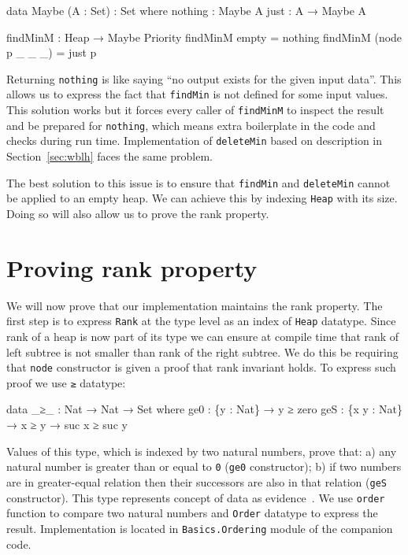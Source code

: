 \begin{code}
data Maybe (A : Set) : Set where
  nothing : Maybe A
  just    : A → Maybe A

findMinM : Heap → Maybe Priority
findMinM empty          = nothing
findMinM (node p _ _ _) = just p
\end{code}

\noindent
Returning \texttt{nothing} is like saying ``no output exists for the given input data''. This allows us to express the fact that \texttt{findMin} is not defined for some input values. This solution works but it forces every caller of \texttt{findMinM} to inspect the result and be prepared for \texttt{nothing}, which means extra boilerplate in the code and checks during run time. Implementation of \texttt{deleteMin} based on description in Section~\ref{sec:wblh} faces the same problem.

The best solution to this issue is to ensure that \texttt{findMin} and \texttt{deleteMin} cannot be applied to an empty heap. We can achieve this by indexing \texttt{Heap} with its size. Doing so will also allow us to prove the rank property.

\section[Proving rank property]{Proving rank property} \label{sec:rank-property}

We will now prove that our implementation maintains the rank property. The first step is to express \texttt{Rank} at the type level as an index of \texttt{Heap} datatype. Since rank of a heap is now part of its type we can ensure at compile time that rank of left subtree is not smaller than rank of the right subtree. We do this be requiring that \texttt{node} constructor is given a proof that rank invariant holds. To express such proof we use \texttt{≥} datatype:

\begin{code}
data _≥_ : Nat → Nat → Set where
  ge0 : \{y : Nat\} → y ≥ zero
  geS : \{x y : Nat\} → x ≥ y → suc x ≥ suc y
\end{code}
\noindent
Values of this type, which is indexed by two natural numbers, prove that: a) any natural number is greater than or equal to \texttt{0} (\texttt{ge0} constructor); b) if two numbers are in greater-equal relation then their successors are also in that relation (\texttt{geS} constructor). This type represents concept of data as evidence~\cite{AltMcBMcK05}. We use \texttt{order} function to compare two natural numbers and \texttt{Order} datatype to express the result. Implementation is located in \texttt{Basics.Ordering} module of the companion code.

